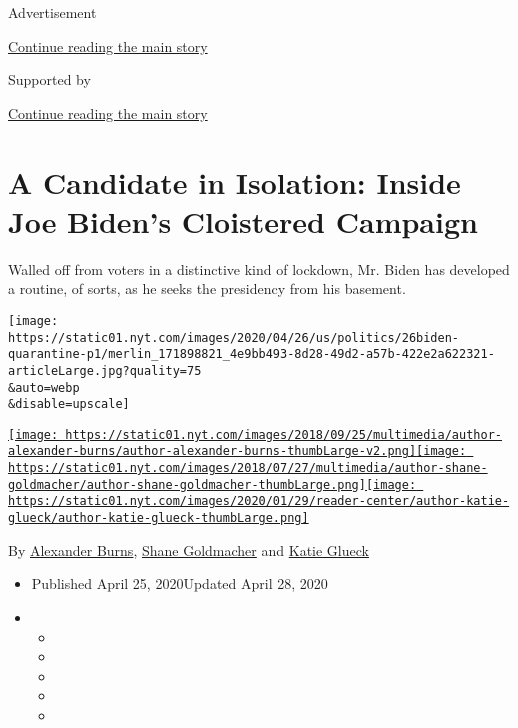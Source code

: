 Advertisement

\protect\hyperlink{after-top}{Continue reading the main story}

Supported by

\protect\hyperlink{after-sponsor}{Continue reading the main story}

\hypertarget{a-candidate-in-isolation-inside-joe-bidens-cloistered-campaign}{%
\section{A Candidate in Isolation: Inside Joe Biden's Cloistered
Campaign}\label{a-candidate-in-isolation-inside-joe-bidens-cloistered-campaign}}

Walled off from voters in a distinctive kind of lockdown, Mr. Biden has
developed a routine, of sorts, as he seeks the presidency from his
basement.

\texttt{[image: https://static01.nyt.com/images/2020/04/26/us/politics/26biden-quarantine-p1/merlin\_171898821\_4e9bb493-8d28-49d2-a57b-422e2a622321-articleLarge.jpg?quality=75\\\&auto=webp\\\&disable=upscale]}

\href{https://www.nytimes.com/by/alexander-burns}{\texttt{[image: https://static01.nyt.com/images/2018/09/25/multimedia/author-alexander-burns/author-alexander-burns-thumbLarge-v2.png]}}\href{https://www.nytimes.com/by/shane-goldmacher}{\texttt{[image: https://static01.nyt.com/images/2018/07/27/multimedia/author-shane-goldmacher/author-shane-goldmacher-thumbLarge.png]}}\href{https://www.nytimes.com/by/katie-glueck}{\texttt{[image: https://static01.nyt.com/images/2020/01/29/reader-center/author-katie-glueck/author-katie-glueck-thumbLarge.png]}}

By \href{https://www.nytimes.com/by/alexander-burns}{Alexander Burns},
\href{https://www.nytimes.com/by/shane-goldmacher}{Shane Goldmacher} and
\href{https://www.nytimes.com/by/katie-glueck}{Katie Glueck}

\begin{itemize}
\item
  Published April 25, 2020Updated April 28, 2020
\item
  \begin{itemize}
  \item
  \item
  \item
  \item
  \item
  \end{itemize}
\end{itemize}

